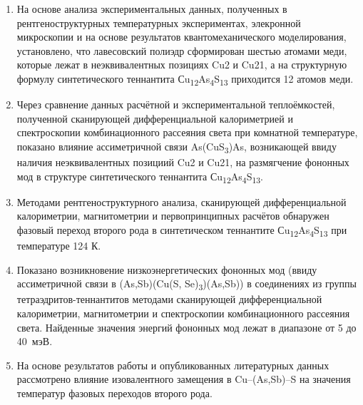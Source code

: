 \begin{enumerate}
						\item На основе анализа экспериментальных данных, полученных в рентгеноструктурных температурных экспериментах, элекронной микроскопии и на основе результатов квантомеханического моделирования, установлено, что 
						лавесовский полиэдр сформирован шестью атомами меди, которые лежат в неэквивалентных позициях Cu2 и Cu21, а на структурную формулу синтетического теннантита Сu\textsubscript{12}As\textsubscript{4}S\textsubscript{13} приходится 12 атомов меди.
						\item Через сравнение данных расчётной  и  экспериментальной теплоёмкостей, полученной сканирующей дифференциальной калориметрией и спектроскопии комбинационного рассеяния света при комнатной температуре, показано влияние ассиметричной связи As(CuS\textsubscript{3})As, возникающей ввиду наличия неэквивалентных позициий Cu2 и Cu21, на размягчение фононных мод в структуре синтетического теннантита Сu\textsubscript{12}As\textsubscript{4}S\textsubscript{13}.
						\item Методами рентгеноструктурного анализа, сканирующей дифференциальной калориметрии, магнитометрии и первопринципных расчётов обнаружен фазовый переход второго рода в синтетическом теннантите Сu\textsubscript{12}As\textsubscript{4}S\textsubscript{13} при температуре 124 К.
						\item Показано возникновение низкоэнергетических фононных мод (ввиду  ассиметричной связи в (As,Sb)(Cu(S, Se)\textsubscript{3})(As,Sb)) в  соединениях из группы тетраэдритов-теннантитов методами сканирующей дифференциальной калориметрии, магнитометрии и спектроскопии комбинационного рассеяния света. Найденные значения энергий фононных мод лежат в диапазоне от 5 до 40~мэВ.
						\item На основе результатов работы и опубликованных литературных данных рассмотрено влияние изовалентного замещения в Cu--(As,Sb)--S на значения температур фазовых переходов второго рода.

\end{enumerate}
